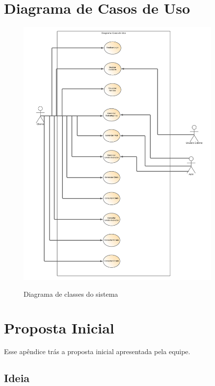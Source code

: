 \begin{apendicesenv}
	\chapter{Diagrama de Casos de Uso}
	\begin{figure}[htb]
		\centering
		\caption{\label{fig_arq_virado}Diagrama de classes do sistema}
		\includegraphics[width=0.90\textwidth]{anexos/Diagrama_em_branco.png}
		\label{diagrama-caso-uso}
	\end{figure}
	
	
	\chapter{Proposta Inicial}
	
	Esse apêndice trás a proposta inicial apresentada pela equipe. 
	
	\section{Ideia}
	

\end{apendicesenv}
